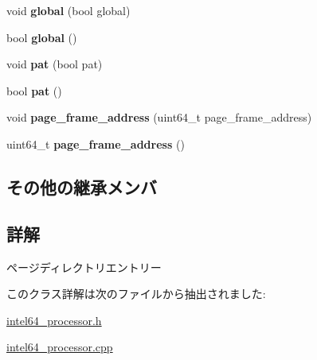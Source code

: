 \begin{DoxyCompactItemize}
\item 
\hypertarget{classintel64__pd__entry_acf431ef25bf4f174d4e412e4569767e3}{}void {\bfseries global} (bool global)\label{classintel64__pd__entry_acf431ef25bf4f174d4e412e4569767e3}

\item 
\hypertarget{classintel64__pd__entry_a12731466c013a12014370848d4123c85}{}bool {\bfseries global} ()\label{classintel64__pd__entry_a12731466c013a12014370848d4123c85}

\item 
\hypertarget{classintel64__pd__entry_ac9864990ab63553408935b0f101774d6}{}void {\bfseries pat} (bool pat)\label{classintel64__pd__entry_ac9864990ab63553408935b0f101774d6}

\item 
\hypertarget{classintel64__pd__entry_a66404e581382d3998719bab4a031cac1}{}bool {\bfseries pat} ()\label{classintel64__pd__entry_a66404e581382d3998719bab4a031cac1}

\item 
\hypertarget{classintel64__pd__entry_a23b7d02f1ce642a18605ce8fd634eca0}{}void {\bfseries page\+\_\+frame\+\_\+address} (uint64\+\_\+t page\+\_\+frame\+\_\+address)\label{classintel64__pd__entry_a23b7d02f1ce642a18605ce8fd634eca0}

\item 
\hypertarget{classintel64__pd__entry_a19732a944e439b21c350089133432916}{}uint64\+\_\+t {\bfseries page\+\_\+frame\+\_\+address} ()\label{classintel64__pd__entry_a19732a944e439b21c350089133432916}

\end{DoxyCompactItemize}
\subsection*{その他の継承メンバ}


\subsection{詳解}
ページディレクトリエントリー 

このクラス詳解は次のファイルから抽出されました\+:\begin{DoxyCompactItemize}
\item 
\hyperlink{intel64__processor_8h}{intel64\+\_\+processor.\+h}\item 
\hyperlink{intel64__processor_8cpp}{intel64\+\_\+processor.\+cpp}\end{DoxyCompactItemize}
